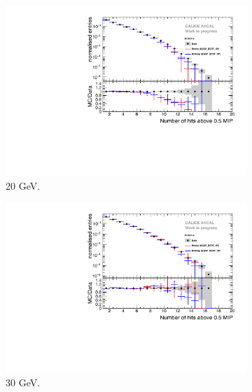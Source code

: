 \begin{figure}[htbp!]
\begin{subfigure}[t]{0.5\textwidth}
		\includegraphics[width=1\textwidth]{chap5/fig_AHCAL_timing/Electrons/Comparison_SimData_Electrons_nHits_20GeV.pdf}
		\caption{20 GeV.}\label{fig:elec_sim_data_nHits_20GeV}
	\end{subfigure}
	\hfill
	\begin{subfigure}[t]{0.5\textwidth}
		\centering
		\includegraphics[width=1\textwidth]{chap5/fig_AHCAL_timing/Electrons/Comparison_SimData_Electrons_nHits_30GeV.pdf}
		\caption{30 GeV.}\label{fig:elec_sim_data_nHits_30GeV}
	\end{subfigure}
	\hfill
	\begin{subfigure}[t]{0.5\textwidth}
		\centering

\end{subfigure}
\end{figure}
